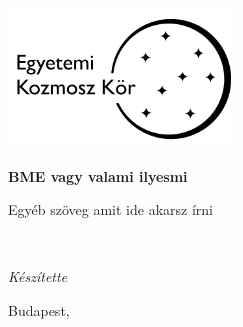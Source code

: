 \hypersetup{pageanchor=false}

\begin{titlepage}
\begin{center}
\includegraphics[width=60mm]{images/kozmosz-logo}\\
\vspace{0.3cm}

\textbf{BME vagy valami ilyesmi}

\vspace{0.1cm}

Egyéb szöveg amit ide akarsz írni

\vspace{5cm}

{\huge \MakeUppercase{\cim}}\\
\vspace{0.8cm}
{\LARGE \alcim}

\vspace{4cm}

{\large \textit{Készítette}}
\vspace{0.3cm}

{\large
    \szerzoA

    \szerzoB

    \szerzoC

    \szerzoD
}

\vfill
{\LARGE Budapest, \datum}
\end{center}
\end{titlepage}